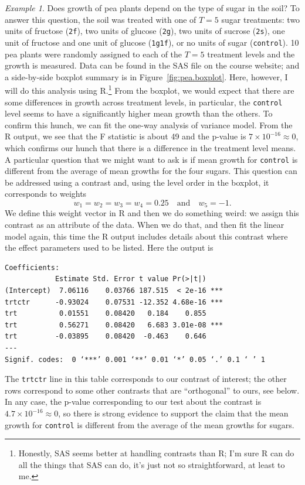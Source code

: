 \documentclass[a4paper, 12pt]{article}
\theoremstyle{plain}
\theoremstyle{definition}
\theoremstyle{remark}
\newtheorem*{example}{Example}
\begin{document}
\begin{example}
Does growth of pea plants depend on the type of sugar in the soil?  To answer this question, the soil was treated with one of $T=5$ sugar treatments: two units of fructose ({\tt 2f}), two units of glucose ({\tt 2g}), two units of sucrose ({\tt 2s}), one unit of fructose and one unit of glucose ({\tt 1g1f}), or no units of sugar ({\tt control}).  10 pea plants were randomly assigned to each of the $T=5$ treatment levels and the growth is measured.  Data can be found in the SAS file on the course website; and a side-by-side boxplot summary is in Figure~\ref{fig:pea.boxplot}.  Here, however, I will do this analysis using R.\footnote{Honestly, SAS seems better at handling contrasts than R; I'm sure R can do all the things that SAS can do, it's just not so straightforward, at least to me.}  From the boxplot, we would expect that there are some differences in growth across treatment levels, in particular, the {\tt control} level seems to have a significantly higher mean growth than the others.  To confirm this hunch, we can fit the one-way analysis of variance model.  From the R output, we see that the F statistic is about 49 and the p-value is $7 \times 10^{-16} \approx 0$, which confirms our hunch that there is a difference in the treatment level means.  A particular question that we might want to ask is if mean growth for {\tt control} is different from the average of mean growths for the four sugars.  This question can be addressed using a contrast and, using the level order in the boxplot, it corresponds to weights 
\[ w_1 = w_2 = w_3 = w_4 = 0.25 \quad \text{and} \quad w_5 = -1. \]
We define this weight vector in R and then we do something weird: we assign this contrast as an attribute of the data.  When we do that, and then fit the linear model again, this time the R output includes details about this contrast where the effect parameters used to be listed.  Here the output is 
{\small
\begin{verbatim}
Coefficients:
            Estimate Std. Error t value Pr(>|t|)    
(Intercept)  7.06116    0.03766 187.515  < 2e-16 ***
trtctr      -0.93024    0.07531 -12.352 4.68e-16 ***
trt          0.01551    0.08420   0.184    0.855    
trt          0.56271    0.08420   6.683 3.01e-08 ***
trt         -0.03895    0.08420  -0.463    0.646    
---
Signif. codes:  0 ‘***’ 0.001 ‘**’ 0.01 ‘*’ 0.05 ‘.’ 0.1 ‘ ’ 1
\end{verbatim}
}
The {\tt trtctr} line in this table corresponds to our contrast of interest; the other rows correspond to some other contrasts that are ``orthogonal'' to ours, see below.  In any case, the p-value corresponding to our test about the contrast is $4.7 \times 10^{-16} \approx 0$, so there is strong evidence to support the claim that the mean growth for {\tt control} is different from the average of the mean growths for sugars.  
\end{example}
\end{document}
